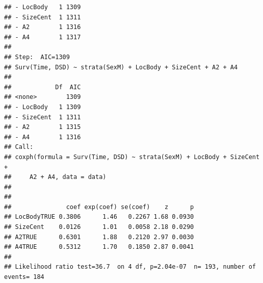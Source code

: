 \documentclass{article}\usepackage[]{graphicx}\usepackage[]{color}
\makeatletter
\newenvironment{kframe}{%
 \def\at@end@of@kframe{}%
 \ifinner\ifhmode%
  \def\at@end@of@kframe{\end{minipage}}%
  \begin{minipage}{\columnwidth}%
 \fi\fi%
 \def\FrameCommand##1{\hskip\@totalleftmargin \hskip-\fboxsep
 \colorbox{shadecolor}{##1}\hskip-\fboxsep
     \hskip-\linewidth \hskip-\@totalleftmargin \hskip\columnwidth}%
 \MakeFramed {\advance\hsize-\width
   \@totalleftmargin\z@ \linewidth\hsize
   \@setminipage}}%
 {\par\unskip\endMakeFramed%
 \at@end@of@kframe}
\newenvironment{knitrout}{}{} %
\makeatother
\begin{document}
\begin{knitrout}
\begin{kframe}
\begin{verbatim}
## - LocBody   1 1309
## - SizeCent  1 1311
## - A2        1 1316
## - A4        1 1317
## 
## Step:  AIC=1309
## Surv(Time, DSD) ~ strata(SexM) + LocBody + SizeCent + A2 + A4
## 
##            Df  AIC
## <none>        1309
## - LocBody   1 1309
## - SizeCent  1 1311
## - A2        1 1315
## - A4        1 1316
## Call:
## coxph(formula = Surv(Time, DSD) ~ strata(SexM) + LocBody + SizeCent + 
##     A2 + A4, data = data)
## 
## 
##               coef exp(coef) se(coef)    z      p
## LocBodyTRUE 0.3806      1.46   0.2267 1.68 0.0930
## SizeCent    0.0126      1.01   0.0058 2.18 0.0290
## A2TRUE      0.6301      1.88   0.2120 2.97 0.0030
## A4TRUE      0.5312      1.70   0.1850 2.87 0.0041
## 
## Likelihood ratio test=36.7  on 4 df, p=2.04e-07  n= 193, number of events= 184
\end{verbatim}
\end{kframe}
\end{knitrout}
\end{document}
